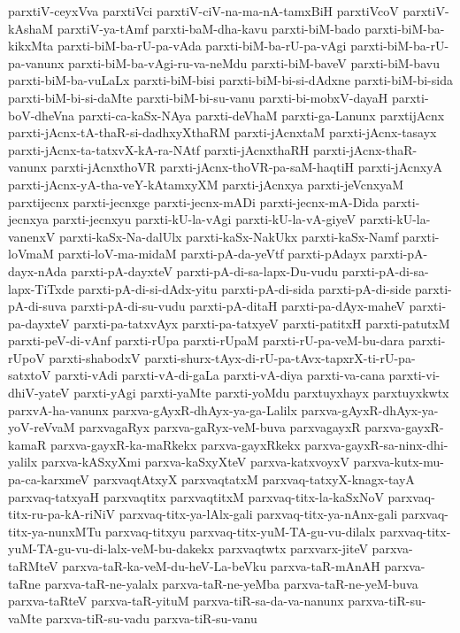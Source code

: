 {parxtiV-ceyxVva
parxtiVci
parxtiV-ciV-na-ma-nA-tamxBiH
parxtiVcoV
parxtiV-kAshaM
parxtiV-ya-tAmf
parxti-baM-dha-kavu
parxti-biM-bado
parxti-biM-ba-kikxMta
parxti-biM-ba-rU-pa-vAda
parxti-biM-ba-rU-pa-vAgi
parxti-biM-ba-rU-pa-vanunx
parxti-biM-ba-vAgi-ru-va-neMdu
parxti-biM-baveV
parxti-biM-bavu
parxti-biM-ba-vuLaLx
parxti-biM-bisi
parxti-biM-bi-si-dAdxne
parxti-biM-bi-sida
parxti-biM-bi-si-daMte
parxti-biM-bi-su-vanu
parxti-bi-mobxV-dayaH
parxti-boV-dheVna
parxti-ca-kaSx-NAya
parxti-deVhaM
parxti-ga-Lanunx
parxtijAcnx
parxti-jAcnx-tA-thaR-si-dadhxyXthaRM
parxti-jAcnxtaM
parxti-jAcnx-tasayx
parxti-jAcnx-ta-tatxvX-kA-ra-NAtf
parxti-jAcnxthaRH
parxti-jAcnx-thaR-vanunx
parxti-jAcnxthoVR
parxti-jAcnx-thoVR-pa-saM-haqtiH
parxti-jAcnxyA
parxti-jAcnx-yA-tha-veY-kAtamxyXM
parxti-jAcnxya
parxti-jeVcnxyaM
parxtijecnx
parxti-jecnxge
parxti-jecnx-mADi
parxti-jecnx-mA-Dida
parxti-jecnxya
parxti-jecnxyu
parxti-kU-la-vAgi
parxti-kU-la-vA-giyeV
parxti-kU-la-vanenxV
parxti-kaSx-Na-dalUlx
parxti-kaSx-NakUkx
parxti-kaSx-Namf
parxti-loVmaM
parxti-loV-ma-midaM
parxti-pA-da-yeVtf
parxti-pAdayx
parxti-pA-dayx-nAda
parxti-pA-dayxteV
parxti-pA-di-sa-lapx-Du-vudu
parxti-pA-di-sa-lapx-TiTxde
parxti-pA-di-si-dAdx-yitu
parxti-pA-di-sida
parxti-pA-di-side
parxti-pA-di-suva
parxti-pA-di-su-vudu
parxti-pA-ditaH
parxti-pa-dAyx-maheV
parxti-pa-dayxteV
parxti-pa-tatxvAyx
parxti-pa-tatxyeV
parxti-patitxH
parxti-patutxM
parxti-peV-di-vAnf
parxti-rUpa
parxti-rUpaM
parxti-rU-pa-veM-bu-dara
parxti-rUpoV
parxti-shabodxV
parxti-shurx-tAyx-di-rU-pa-tAvx-tapxrX-ti-rU-pa-satxtoV
parxti-vAdi
parxti-vA-di-gaLa
parxti-vA-diya
parxti-va-cana
parxti-vi-dhiV-yateV
parxti-yAgi
parxti-yaMte
parxti-yoMdu
parxtuyxhayx
parxtuyxkwtx
parxvA-ha-vanunx
parxva-gAyxR-dhAyx-ya-ga-Lalilx
parxva-gAyxR-dhAyx-ya-yoV-reVvaM
parxvagaRyx
parxva-gaRyx-veM-buva
parxvagayxR
parxva-gayxR-kamaR
parxva-gayxR-ka-maRkekx
parxva-gayxRkekx
parxva-gayxR-sa-ninx-dhi-yalilx
parxva-kASxyXmi
parxva-kaSxyXteV
parxva-katxvoyxV
parxva-kutx-mu-pa-ca-karxmeV
parxvaqtAtxyX
parxvaqtatxM
parxvaq-tatxyX-knagx-tayA
parxvaq-tatxyaH
parxvaqtitx
parxvaqtitxM
parxvaq-titx-la-kaSxNoV
parxvaq-titx-ru-pa-kA-riNiV
parxvaq-titx-ya-lAlx-gali
parxvaq-titx-ya-nAnx-gali
parxvaq-titx-ya-nunxMTu
parxvaq-titxyu
parxvaq-titx-yuM-TA-gu-vu-dilalx
parxvaq-titx-yuM-TA-gu-vu-di-lalx-veM-bu-dakekx
parxvaqtwtx
parxvarx-jiteV
parxva-taRMteV
parxva-taR-ka-veM-du-heV-La-beVku
parxva-taR-mAnAH
parxva-taRne
parxva-taR-ne-yalalx
parxva-taR-ne-yeMba
parxva-taR-ne-yeM-buva
parxva-taRteV
parxva-taR-yituM
parxva-tiR-sa-da-va-nanunx
parxva-tiR-su-vaMte
parxva-tiR-su-vadu
parxva-tiR-su-vanu
}
